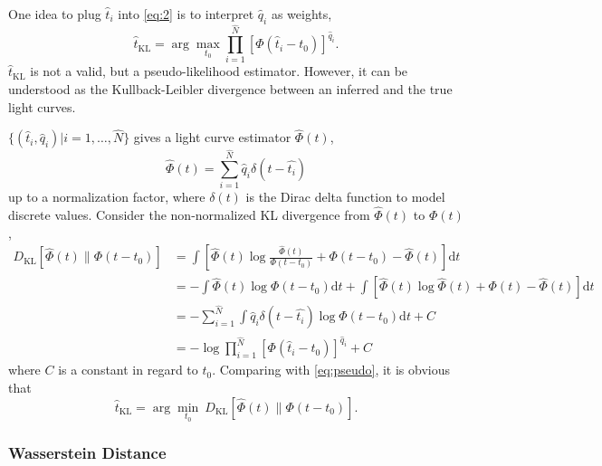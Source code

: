 One idea to plug $\hat{t}_i$ into \eqref{eq:2} is to interpret $\hat{q}_i$ as weights,
\begin{equation}
  \label{eq:pseudo}
  \hat{t}_\mathrm{KL} = \arg\underset{t_0}{\max} \prod_{i=1}^{\hat{N}} \left[\Phi(\hat{t}_i-t_0)\right]^{\hat{q}_i}.
\end{equation}
$\hat{t}_\mathrm{KL}$ is not a valid, but a pseudo-likelihood estimator. However, it can be understood as the Kullback-Leibler divergence between an inferred and the true light curves.

$\{(\hat{t}_i, \hat{q}_i)|i=1,\ldots,\hat{N}\}$ gives a light curve estimator $\hat{\Phi}(t)$,
\begin{equation}
  \label{eq:lc}
  \hat{\Phi}(t) = \sum_{i=1}^{\hat{N}} \hat{q}_i\delta(t-\hat{t_i})
\end{equation}
up to a normalization factor, where $\delta(t)$ is the Dirac delta function to model discrete values.  Consider the non-normalized KL divergence from $\hat{\Phi}(t)$ to $\Phi(t)$,
\begin{equation}
  \begin{aligned}
    D_\mathrm{KL}\left[\hat{\Phi}(t) \parallel \Phi(t-t_0)\right] & =\int \left[\hat{\Phi}(t) \log\frac{\hat{\Phi}(t)}{\Phi(t-t_0)} + \Phi(t-t_0) - \hat{\Phi}(t) \right]\mathrm{d}t \\
    & = - \int \hat{\Phi}(t) \log\Phi(t-t_0)\mathrm{d}t + \int \left[\hat{\Phi}(t) \log\hat{\Phi}(t) + \Phi(t) - \hat{\Phi}(t) \right]\mathrm{d}t \\
    & = - \sum_{i=1}^{\hat{N}}\int \hat{q}_i\delta(t-\hat{t_i}) \log\Phi(t-t_0)\mathrm{d}t + C \\
    & = -\log \prod_{i=1}^{\hat{N}} \left[\Phi(\hat{t}_i-t_0)\right]^{\hat{q}_i} + C
  \label{eq:kl}
  \end{aligned}
\end{equation}
where $C$ is a constant in regard to $t_0$.  Comparing with \eqref{eq:pseudo}, it is obvious that
\begin{equation}
  \label{eq:kl2}
  \hat{t}_\mathrm{KL} = \arg\underset{t_0}{\min}~D_\mathrm{KL}\left[\hat{\Phi}(t) \parallel \Phi(t-t_0)\right].
\end{equation}


\subsubsection{Wasserstein Distance}
\label{sec:W-dist}



